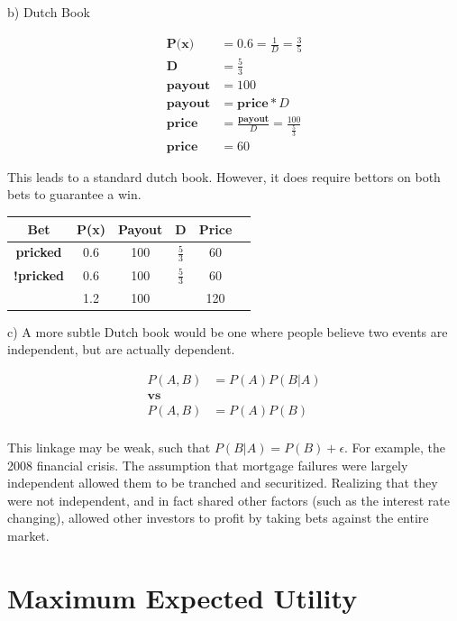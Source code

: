 \documentclass[11pt]{article}
\begin{document}
b) Dutch Book

\begin{align*}
	\textbf{P(x)} &= 0.6 = \frac{1}{D} = \frac{3}{5} \\
	\textbf{D} &= \frac{5}{3} \\
	\textbf{payout} &= 100 \\
	\textbf{payout} &= \textbf{price} * D \\
	\textbf{price} &= \frac{\textbf{payout}}{D} = \frac{100}{\frac{5}{3}} \\
	\textbf{price} &= 60
\end{align*}

This leads to a standard dutch book. However, it does require bettors on both bets to guarantee a win.

\begin{center}
	\begin{tabular}{|c | c | c | c | c | c |}
		\hline
		\textbf{Bet} & \textbf{P(x)} &  \textbf{Payout} & \textbf{D} &  \textbf{Price} \\
		\hline		
		\textbf{pricked}  & 0.6 & 100 & $\frac{5}{3}$ &  60 \\
		\hline		
		\textbf{!pricked} & 0.6 & 100 & $\frac{5}{3}$ & 60 \\
		\hline
		 & 1.2 & 100 &  & 120 \\
		\hline		 
	\end{tabular}
\end{center}

c) A more subtle Dutch book would be one where people believe two events are independent, but are actually dependent.


\begin{align*}
P(A,B) &= P(A)P(B|A)\\
\textbf{vs} \\
P(A,B) &= P(A)P(B) \\
\end{align*}

This linkage may be weak, such that $P(B|A) = P(B) + \epsilon$. For example, the 2008 financial crisis. The assumption that mortgage failures were largely independent allowed them to be tranched and securitized. Realizing that they were not independent, and in fact shared other factors (such as the interest rate changing), allowed other investors to profit by taking bets against the entire market.

\section{Maximum Expected Utility}
\end{document}
